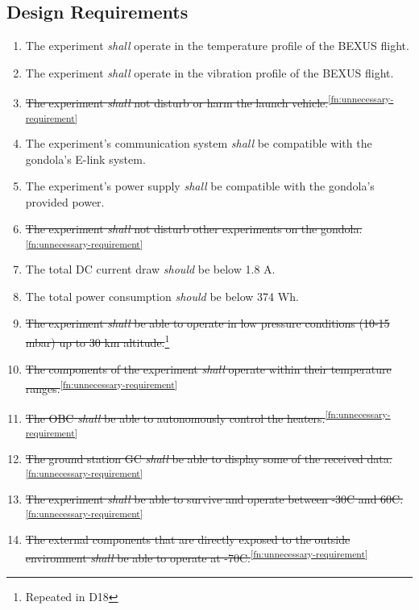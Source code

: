 \subsection{Design Requirements}

\begin{enumerate}[label=D.\arabic*]
    \item The experiment \textit{shall} operate in the temperature profile of the BEXUS flight.
    \item The experiment \textit{shall} operate in the vibration profile of the BEXUS flight.
    \item \st{The experiment \textit{shall} not disturb or harm the launch vehicle.}\textsuperscript{\ref{fn:unnecessary-requirement}}
    \item The experiment's communication system \textit{shall} be compatible with the gondola's E-link system.
    \item The experiment's power supply \textit{shall} be compatible with the gondola's provided power.
    \item \st{The experiment \textit{shall} not disturb other experiments on the gondola.}\textsuperscript{\ref{fn:unnecessary-requirement}}
    \item The total DC current draw \textit{should} be below 1.8 A.
    \item The total power consumption \textit{should} be below 374 Wh.
    \item \st{The experiment \textit{shall} be able to operate in low pressure conditions (10-15 mbar) up to 30 km altitude.}\footnote{Repeated in D18\label{fn:repeat-d18}}
    \item \st{The components of the experiment \textit{shall} operate within their temperature ranges.}\textsuperscript{\ref{fn:unnecessary-requirement}}
    \item \st{The OBC \textit{shall} be able to autonomously control the heaters.}\textsuperscript{\ref{fn:unnecessary-requirement}}
    \item \st{The ground station GC \textit{shall} be able to display some of the received data.}\textsuperscript{\ref{fn:unnecessary-requirement}}
    \item \st{The experiment \textit{shall} be able to survive and operate between -30\degree C and 60\degree C.}\textsuperscript{\ref{fn:unnecessary-requirement}}
    \item \st{The external components that are directly exposed to the outside environment \textit{shall} be able to operate at -70\degree C.}\textsuperscript{\ref{fn:unnecessary-requirement}}

\end{enumerate}
